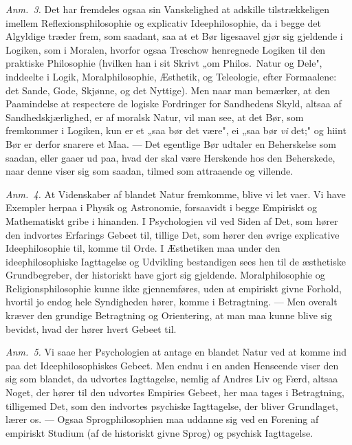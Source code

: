 \documentclass[12pt,a4paper]{book}
\newcommand{\apage}[1]{\marginnote{\footnotesize\textit{[#1]}}}
\begin{document}
{\small\emph{Anm.~3.} Det har fremdeles ogsaa sin Vanskelighed at adskille
tilstrækkeligen imellem Reflexionsphilosophie og explicativ Ideephilosophie, da i
begge det Algyldige træder frem, som saadant, saa at et Bør ligesaavel gjør sig
gjeldende i Logiken, som i Moralen, hvorfor ogsaa Treschow henregnede Logiken til
den praktiske Philosophie (hvilken han i sit Skrivt „om Philos.\ Natur og Dele",
inddeelte i Logik, Moralphilosophie, Æsthetik, og Teleologie, efter Formaalene: det
Sande, Gode, Skjønne, og det Nyttige). Men naar man bemærker, at den Paamindelse at
respectere de logiske Fordringer for Sandhedens Skyld, altsaa af Sandhedskjærlighed,
er af moralsk Natur, vil man see, at det Bør, som fremkommer i Logiken, kun er et
„saa bør det være", ei „saa bør \emph{vi} det;" og hiint Bør er derfor snarere et
Maa. --- Det egentlige Bør udtaler en Beherskelse som saadan, eller gaaer ud paa,
hvad der skal være Herskende hos den Beherskede, naar denne viser sig som saadan,
tilmed som attraaende og villende.\par}

{\small\emph{Anm.~4.} At Videnskaber af blandet Natur fremkomme, blive vi let vaer.
Vi have Exempler herpaa i Physik og Astronomie, forsaavidt i begge Empiriskt og
Mathematiskt gribe i hinanden. I Psychologien vil ved Siden af Det, som hører den
indvortes Erfarings Gebeet til, tillige Det, som hører den øvrige explicative
Ideephilosophie til, komme til Orde. I Æsthetiken maa under den ideephilosophiske
Iagttagelse og Udvikling bestandigen sees hen til de æsthetiske Grundbegreber, der
historiskt have gjort sig gjeldende. Moralphilosophie og Religionsphilosophie kunne
ikke gjennemføres, uden at empiriskt givne Forhold, hvortil jo endog hele
Syndigheden hører, komme i Betragtning. --- Men overalt kræver den grundige
Betragtning og Orientering, at man maa kunne blive sig bevidst, hvad der hører hvert
Gebeet til.\par} \apage{40} 

{\small\emph{Anm.~5.} Vi saae her Psychologien at antage en blandet Natur ved at
komme ind paa det Ideephilosophiskes Gebeet. Men endnu i en anden Henseende viser
den sig som blandet, da udvortes Iagttagelse, nemlig af Andres Liv og Færd, altsaa
Noget, der hører til den udvortes Empiries Gebeet, her maa tages i Betragtning,
tilligemed Det, som den indvortes psychiske Iagttagelse, der bliver Grundlaget,
lærer os. --- Ogsaa Sprogphilosophien maa uddanne sig ved en Forening af empiriskt
Studium (af de historiskt givne Sprog) og psychisk Iagttagelse.\par}
\end{document}
